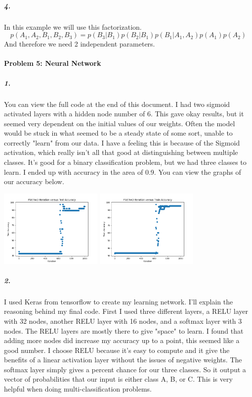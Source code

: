 \documentclass[12pt]{article}
\begin{document}
    \subparagraph{4.}
    In this example we will use this factorization.
    \[
        p(A_1, A_2, B_1, B_2, B_3) = p(B_3 | B_1) p(B_2 | B_1) p(B_1 | A_1, A_2) p(A_1) p(A_2)
    \]
    And therefore we need 2 independent parameters.

    \paragraph{Problem 5: Neural Network}
    \subparagraph{1.}
    You can view the full code at the end of this document. I had two sigmoid activated layers with a 
    hidden node number of 6. This gave okay results, but it seemed very dependent on the initial values of our
    weights. Often the model would be stuck in what seemed to be a steady state of some sort, unable to correctly
    "learn" from our data. I have a feeling this is because of the Sigmoid activation, which really isn't all that 
    good at distinguishing between multiple classes. It's good for a binary classification problem, but we had three 
    classes to learn. I ended up with accuracy in the area of 0.9. You can view the graphs of our accuracy below.
    \begin{center}
    \includegraphics[width=5cm]{hw3_test.png}
    \includegraphics[width=5cm]{hw3_train.png}
    \end{center}

    \subparagraph{2.}
    I used Keras from tensorflow to create my learning network. I'll explain the reasoning behind my final code.
    First I used three different layers, a RELU layer with 32 nodes, another RELU layer with 
    16 nodes, and a softmax layer with 3 nodes. The RELU layers are mostly there to give "space" to learn. I found that
    adding more nodes did increase my accuracy up to a point, this seemed like a good number. I choose RELU because it's 
    easy to compute and it give the benefits of a linear activation layer without the issues of negative weights. The softmax
    layer simply gives a percent chance for our three classes. So it output a vector of probabilities that our input is either class A,
    B, or C. This is very helpful when doing multi-classification problems.
\end{document}
